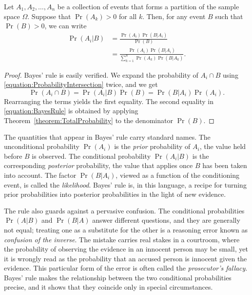\begin{theorem} 
Let $A_1, A_2, \ldots, A_n$ be a collection of events that forms a partition of the sample space $\Omega$.
Suppose that $\Pr (A_k) > 0$ for all $k$.
Then, for any event $B$ such that $\Pr (B) > 0$, we can write
\begin{equation} \label{equation:BayesRule}
\begin{split}
\Pr (A_i | B)
&= \frac{ \Pr (A_i) \Pr (B | A_i) }{ \Pr (B) } \\
&= \frac{ \Pr (A_i) \Pr (B | A_i) }
{ \sum_{k=1}^n \Pr (A_k) \Pr (B | A_k) } .
\end{split}
\end{equation}
\end{theorem}
\begin{proof}
Bayes' rule is easily verified.
We expand the probability of $A_i \cap B$ using \eqref{equation:ProbabilityIntersection} twice, and we get
\begin{equation*}
\Pr (A_i \cap B) = \Pr (A_i | B) \Pr (B) = \Pr (B | A_i) \Pr (A_i).
\end{equation*}
Rearranging the terms yields the first equality.
The second equality in \eqref{equation:BayesRule} is obtained by applying Theorem~\ref{theorem:TotalProbability} to the denominator $\Pr(B)$.
\end{proof}

The quantities that appear in Bayes' rule carry standard names.
The unconditional probability $\Pr (A_i)$ is the \emph{prior} probability of $A_i$, the value held before $B$ is observed.
The conditional probability $\Pr (A_i | B)$ is the corresponding \emph{posterior} probability, the value that applies once $B$ has been taken into account.
The factor $\Pr (B | A_i)$, viewed as a function of the conditioning event, is called the \emph{likelihood}.
Bayes' rule is, in this language, a recipe for turning prior probabilities into posterior probabilities in the light of new evidence.

The rule also guards against a pervasive confusion.
The conditional probabilities $\Pr (A | B)$ and $\Pr (B | A)$ answer different questions, and they are generally not equal;
treating one as a substitute for the other is a reasoning error known as \emph{confusion of the inverse}.
The mistake carries real stakes in a courtroom, where the probability of observing the evidence in an innocent person may be small, yet it is wrongly read as the probability that an accused person is innocent given the evidence.
This particular form of the error is often called the \emph{prosecutor's fallacy}.
Bayes' rule makes the relationship between the two conditional probabilities precise, and it shows that they coincide only in special circumstances.

